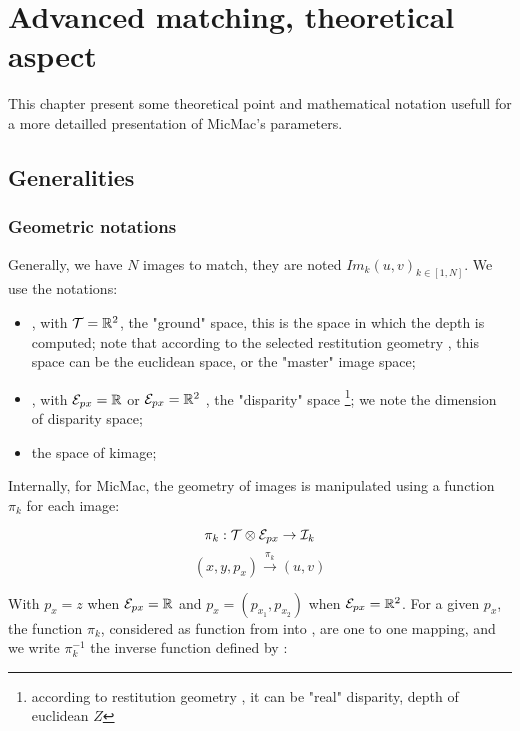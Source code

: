 \chapter{Advanced matching, theoretical aspect}


This chapter present some theoretical point and mathematical notation 
usefull for  a more detailled presentation  of MicMac's parameters.


\section{Generalities}

\subsection{Geometric notations}

Generally, we have $N$ images to match, they are noted $Im_k(u,v)_{k\in [1,N]}$.
We use the notations:


\begin{itemize}
   \item \ETer,  with  $\ETer = \RR ^2$,  the "ground" space, this is
         the space in which the depth is computed; note that according
         to the selected restitution geometry , this space can be the 
         euclidean space, or the "master" image space;


   \item \EPx, with  $\EPx = \RR$ or   $\EPx = \RR ^2$ , the "disparity" space
          \footnote{according to restitution geometry , it can be "real" disparity, depth of euclidean $Z$};
          we note  \DimPx the dimension of disparity space;

   \item \EIm the space of  k\KTH image;
\end{itemize}


Internally, for MicMac, the geometry of images is manipulated using
a function  $\pi_k$ for each image: 

\begin{equation}
   \pi_k :   \ETer \otimes \EPx \rightarrow \EIm
\end{equation}
\begin{equation}
              (x,y,p_x)  \stackrel{\pi_k}{\rightarrow}  (u,v)
\end{equation}

With $p_x=z$ when $\EPx = \RR$ and   $p_x=(p_{x_1},p_{x_2})$
when $\EPx = \RR^2$. For a given $p_x$, the function $\pi_k$,
considered as function from \ETer into  \EIm, are one to one mapping,
and we write $\pi_k^{-1}$ the inverse function defined by :


